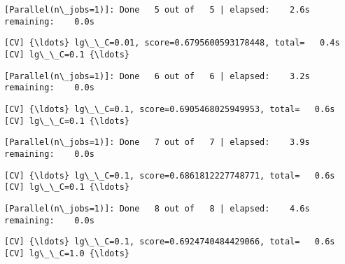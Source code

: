 \documentclass[11pt]{article}
\begin{document}
    \begin{Verbatim}[commandchars=\\\{\}]
[Parallel(n\_jobs=1)]: Done   5 out of   5 | elapsed:    2.6s remaining:    0.0s

    \end{Verbatim}

    \begin{Verbatim}[commandchars=\\\{\}]
[CV] {\ldots} lg\_\_C=0.01, score=0.6795600593178448, total=   0.4s
[CV] lg\_\_C=0.1 {\ldots}

    \end{Verbatim}

    \begin{Verbatim}[commandchars=\\\{\}]
[Parallel(n\_jobs=1)]: Done   6 out of   6 | elapsed:    3.2s remaining:    0.0s

    \end{Verbatim}

    \begin{Verbatim}[commandchars=\\\{\}]
[CV] {\ldots} lg\_\_C=0.1, score=0.6905468025949953, total=   0.6s
[CV] lg\_\_C=0.1 {\ldots}

    \end{Verbatim}

    \begin{Verbatim}[commandchars=\\\{\}]
[Parallel(n\_jobs=1)]: Done   7 out of   7 | elapsed:    3.9s remaining:    0.0s

    \end{Verbatim}

    \begin{Verbatim}[commandchars=\\\{\}]
[CV] {\ldots} lg\_\_C=0.1, score=0.6861812227748771, total=   0.6s
[CV] lg\_\_C=0.1 {\ldots}

    \end{Verbatim}

    \begin{Verbatim}[commandchars=\\\{\}]
[Parallel(n\_jobs=1)]: Done   8 out of   8 | elapsed:    4.6s remaining:    0.0s

    \end{Verbatim}

    \begin{Verbatim}[commandchars=\\\{\}]
[CV] {\ldots} lg\_\_C=0.1, score=0.6924740484429066, total=   0.6s
[CV] lg\_\_C=1.0 {\ldots}

    \end{Verbatim}
\end{document}
